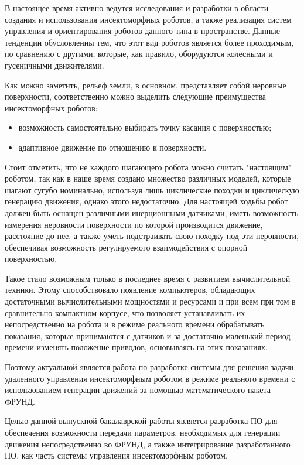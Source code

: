 \aftertitle

В настоящее время активно ведутся исследования и разработки в области создания и использования инсектоморфных роботов, а также реализация систем управления и ориентирования роботов данного типа в пространстве. Данные тенденции обусловленны тем, что этот вид роботов является более проходимым, по сравнению с другими, которые, как правило, оборудуются колесными и гусеничными движителями.

Как можно заметить, рельеф земли, в основном, представляет собой неровные поверхности, соответственно можно выделить следующие преимущества инсектоморфных роботов: 
\begin{itemize}
	\item возможность самостоятельно выбирать точку касания с поверхностью;
	\item адаптивное движение по отношению к поверхности.
\end{itemize}

Стоит отметить, что не каждого шагающего робота можно считать "настоящим"{} роботом, так как в наше время создано  множество различных моделей, которые шагают сугубо номинально, используя лишь циклические походки и циклическую генерацию движения, однако этого недостаточно. Для настоящей ходьбы робот должен быть оснащен различными инерционными датчиками, иметь возможность измерения неровности поверхности по которой производится движение, расстояние до нее, а также уметь подстраивать свою походку под эти неровности, обеспечивая возможность регулируемого взаимодействия с опорной поверхностью.

Такое стало возможным только в последнее время с развитием вычислительной техники. Этому способствовало появление компьютеров, обладающих достаточными вычислительными мощностями и ресурсами и при всем при том в сравнительно компактном корпусе, что позволяет устанавливать их непосредственно на робота и в режиме реального времени обрабатывать показания, которые принимаются с датчиков и за достаточно маленький период времени изменять положение приводов, основываясь на этих показаниях.

Поэтому актуальной является работа по разработке системы для решения задачи удаленного управления инсектоморфным роботом в режиме реального времени с использованием генерации движений за помощью математического пакета ФРУНД.


Целью данной выпускной бакалаврской работы является разработка ПО для обеспечения возможности передачи параметров, необходимых для генерации движения непосредственно во ФРУНД, а также интегрирование разработанного ПО, как часть системы управления инсектоморфным роботом.

